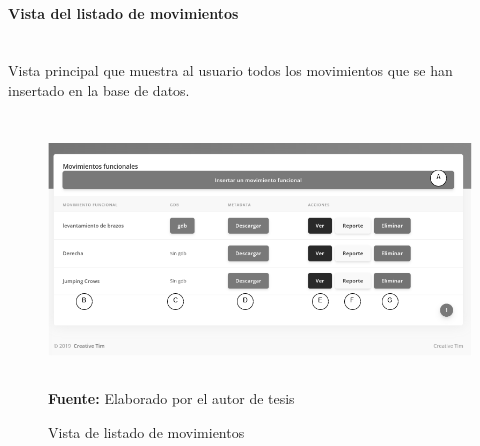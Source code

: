 \paragraph{Vista del listado de movimientos}\mbox{} \\ \label{ins:UI:web:index}
Vista principal que muestra al usuario todos los movimientos que se han insertado en la base de datos.
\begin{figure}[H]
	\caption{Vista de listado de movimientos}
	\label{fig:viewIndex}
	\centering
	\includegraphics[width=440px,height=270px]{graphics/web-index.PNG} \\
	\textbf{Fuente:} Elaborado por el autor de tesis
\end{figure}
